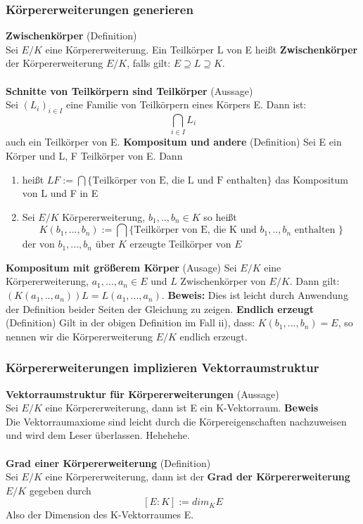 \documentclass[a4paper, 10pt]{scrartcl}
\begin{document}
\subsubsection{Körpererweiterungen generieren}
\textbf{Zwischenkörper} (Definition)\\
Sei $E/K$ eine Körpererweiterung. Ein Teilkörper L von E heißt \textbf{Zwischenkörper} der Körpererweiterung $E/K$, falls gilt: $E \supseteq L \supseteq K$.
\\
\\
\textbf{Schnitte von Teilkörpern sind Teilkörper} (Aussage)\\
Sei $(L_i)_{i \in I}$ eine Familie von Teilkörpern eines Körpers E. Dann ist:
$$\bigcap_{i \in I} L_i$$
auch ein Teilkörper von E.
\newline
\newline 
\textbf{Kompositum und andere} (Definition)
Sei E ein Körper und L, F Teilkörper von E. Dann
\begin{enumerate}[label=\roman*)]
\item heißt $LF := \bigcap \{\text{Teilkörper von E, die L und F enthalten} \}$ das Kompositum von L und F in E
\item Sei $E/K$ Körpererweiterung, $b_1,..,b_n \in K$ so heißt $$K(b_1,...,b_n):= \bigcap \{ \text{Teilkörper von E, die K und } b_1,..,b_n \text{  enthalten } \}$$
der von $b_1,...,b_n$ über $K$ erzeugte Teilkörper von $E$

\end{enumerate}
\textbf{Kompositum mit größerem Körper} (Ausage)\newline
Sei $E/K$ eine Körpererweiterung, $a_1,...,a_n \in E$ und $L$ Zwischenkörper von $E/K$. Dann gilt: $(K(a_1,..,a_n))L = L(a_1,...,a_n)$.\newline
\textbf{Beweis:}\newline
Dies ist leicht durch Anwendung der Definition beider Seiten der Gleichung zu zeigen.\newline
\newline
\textbf{Endlich erzeugt} (Definition) \newline
Gilt in der obigen Definition im Fall ii), dass: $K(b_1,...,b_n) = E$, so nennen wir die Körpererweiterung $E/K$ endlich erzeugt.



\subsubsection{Körpererweiterungen implizieren Vektorraumstruktur}
\textbf{Vektorraumstruktur für Körpererweiterungen} (Aussage)\\
Sei $E/K$ eine Körpererweiterung, dann ist E ein K-Vektorraum.
\textbf{Beweis}\\
Die Vektorraumaxiome sind leicht durch die Körpereigenschaften nachzuweisen und wird dem Leser überlassen. Hehehehe.
\\
\\
\textbf{Grad einer Körpererweiterung} (Definition)\\
Sei $E/K$ eine Körpererweiterung, dann ist der \textbf{Grad der Körpererweiterung $E/K$} gegeben durch $$[E:K]:=dim_K E$$
Also der Dimension des K-Vektorraumes E.\newline
\end{document}
